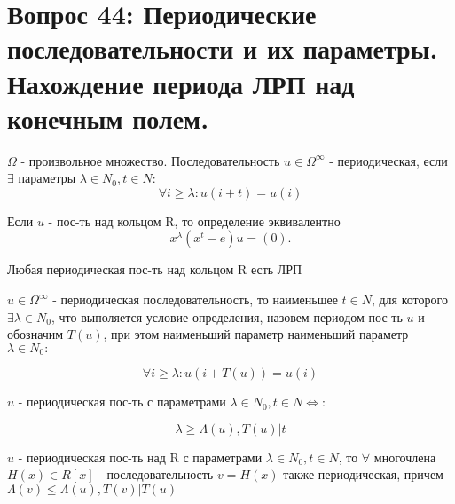 \section{Вопрос 44:
Периодические последовательности и их параметры. Нахождение периода ЛРП над конечным полем.}

\begin{defs}
$\Omega$ - произвольное множество.
Последовательность $u \in \Omega^{\infty}$ - периодическая, если $\exists$ параметры $\lambda \in N_0, t \in N:$
$$\forall i \geq \lambda: u(i + t) = u(i)$$

Если $u$ - пос-ть над кольцом R, то определение эквивалентно
 $$x^\lambda (x^t - e) u = (0).$$
\end{defs}

\begin{proofs}
Любая периодическая пос-ть над кольцом R есть ЛРП
\end{proofs}

\begin{defs}
 $u \in \Omega^{\infty}$ - периодическая последовательность, то наименьшее $t \in N$, для которого $\exists \lambda \in N_0$, что выполяется условие определения, назовем периодом пос-ть $u$ и обозначим $T(u)$, при этом наименьший параметр наименьший параметр $\lambda \in N_0:$

 $$\forall i \geq \lambda: u(i + T(u)) = u(i)$$  
\end{defs}


\begin{proofs}
$u$ - периодическая пос-ть с параметрами $\lambda \in N_0, t \in N \Leftrightarrow:$

$$\lambda \geq \Lambda(u), T(u) | t$$
\end{proofs}

\begin{proofs}
$u$ - периодическая пос-ть над R с параметрами $\lambda \in N_0, t \in N$, то $\forall$ многочлена $H(x) \in R[x]$ - последовательность $v = H(x)$ также периодическая, причем $\Lambda(v) \leq \Lambda(u), T(v) | T(u)$
\end{proofs}


